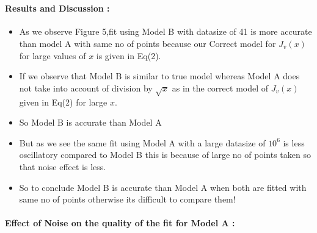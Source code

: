 \documentclass[a4paper,10pt]{article}
\providecommand{\tightlist}{%
      \setlength{\itemsep}{0pt}\setlength{\parskip}{0pt}}
\begin{document}
    \begin{center}
    \end{center}
    { \hspace*{\fill} \\}
    
    \paragraph{Results and Discussion :}\label{results-and-discussion}

\begin{itemize}
\tightlist
\item
  As we observe Figure 5,fit using Model B with datasize of 41 is more
  accurate than model A with same no of points because our Correct model
  for \(J_v(x)\) for large values of \(x\) is given in Eq(2).
\item
  If we observe that Model B is similar to true model whereas Model A
  does not take into account of division by \(\sqrt{x}\) as in the
  correct model of \(J_{v}(x)\) given in Eq(2) for large \(x\).
\item
  So Model B is accurate than Model A
\item
  But as we see the same fit using Model A with a large datasize of
  \(10^6\) is less oscillatory compared to Model B this is because of
  large no of points taken so that noise effect is less.
\item
  So to conclude Model B is accurate than Model A when both are fitted
  with same no of points otherwise its difficult to compare them!
\end{itemize}

    \paragraph{Effect of Noise on the quality of the fit for Model A
:}\label{effect-of-noise-on-the-quality-of-the-fit-for-model-a}
\end{document}
